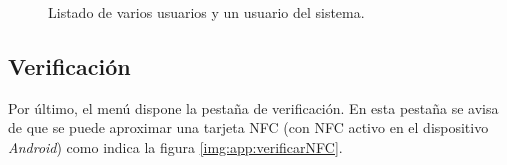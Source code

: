 \documentclass[../PFC.tex]{subfiles}
\begin{document}
\begin{figure}[H]
  \centering
  \null\hfill
  \caption{Listado de varios usuarios y un usuario del sistema.}
  \label{img:app:verUsuarios}
\end{figure}

\subsection{Verificación}
\label{App:Verificacion}

Por último, el menú dispone la pestaña de verificación. En esta pestaña se avisa de que se puede aproximar una tarjeta NFC (con NFC activo en el dispositivo \textit{Android}) como indica la figura \ref{img:app:verificarNFC}.
\end{document}
